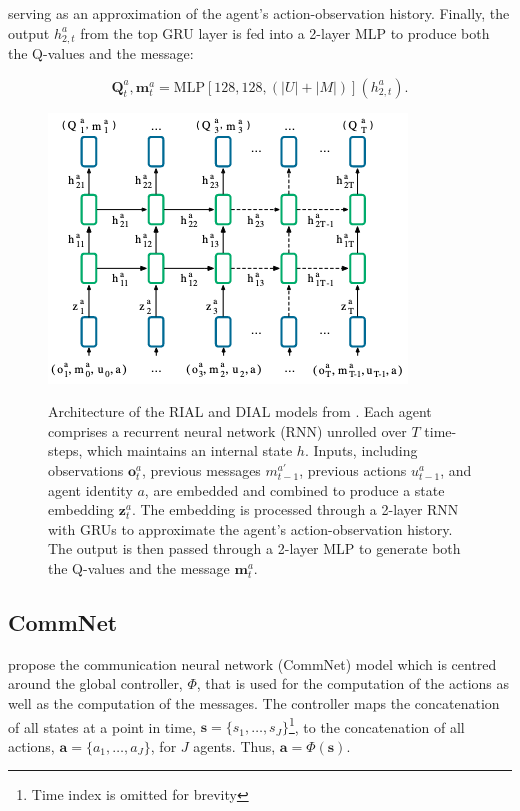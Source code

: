 \documentclass{article}
\begin{document}
serving as an approximation of the agent’s action-observation history. Finally, the output \( h_{2, t}^a \) from the top GRU layer is fed into a 2-layer MLP to produce both the Q-values and the message:

$$
\mathbf{Q}_t^a, \mathbf{m}_t^a = \text{MLP}[128, 128, (|U| + |M|)](h_{2, t}^a).
$$


\begin{figure}
	\centering
	\includegraphics[scale=0.7]{images/rial_dial_nn.png}\
	\caption{Architecture of the RIAL and DIAL models from \citet{foerster2016learning}. Each agent comprises a recurrent neural network (RNN) unrolled over \( T \) time-steps, which maintains an internal state \( h \). Inputs, including observations \( \mathbf{o}_t^a \), previous messages \( m_{t-1}^{a'} \), previous actions \( u_{t-1}^a \), and agent identity \( a \), are embedded and combined to produce a state embedding \( \mathbf{z}_t^a \). The embedding is processed through a 2-layer RNN with GRUs to approximate the agent’s action-observation history. The output is then passed through a 2-layer MLP to generate both the Q-values and the message \( \mathbf{m}_t^a \).}
	\label{fig:rial_dial_nn}
\end{figure}

\subsection{CommNet}

\citet{sukhbaatar2016commnet} propose the communication neural network (CommNet) model which is centred around the global controller, $\Phi$, that is used for the computation of the actions as well as the computation of the messages. The controller maps the concatenation of all states at a point in time, $\mathbf{s} = \{ s_1, \hdots, s_J \}$\footnote{Time index is omitted for brevity}, to the concatenation of all actions, $\mathbf{a} = \{ a_1, \hdots, a_J \}$, for $J$ agents. Thus, $\mathbf{a} = \Phi(\mathbf{s})$. 
\end{document}
